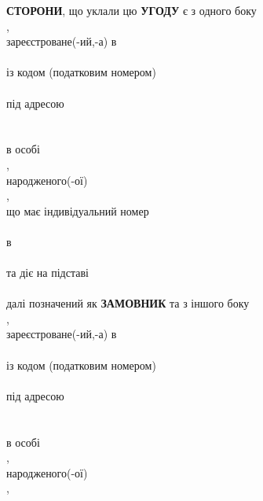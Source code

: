 \begin{Form}
    \begin{paracol}{3}
      \freetext %
        { \textbf{СТОРОНИ}, що уклали цю \textbf{УГОДУ} є з одного боку \\
          ,\\
          зареєстроване(-ий,-а) в\\
          \\
          із кодом (податковим номером)\\
          \\
          під адресою\\
          \\
          \\
          в особі\\
          ,\\
          народженого(-ої)\\
          ,\\
          що має індивідуальний номер\\
          \\
          в \\
          \\
          та діє на підставі\\
          \\
          далі позначений як \textbf{ЗАМОВНИК} та з іншого боку\\
          ,\\
          зареєстроване(-ий,-а) в\\
          \\
          із кодом (податковим номером)\\
          \\
          під адресою\\
          \\
          \\
          в особі\\
          ,\\
          народженого(-ої)\\
          ,\\
}
\end{paracol}
\end{Form}
